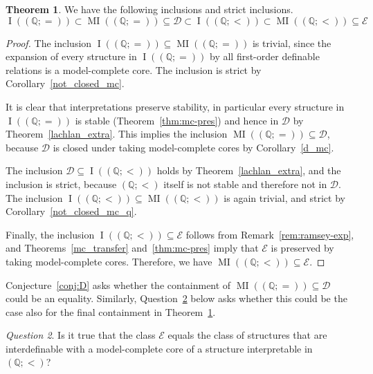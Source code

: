 \documentclass{amsart}
\theoremstyle{definition}
\newtheorem{theorem}{Theorem}[section]
\theoremstyle{remark}
\newtheorem{question}[theorem]{Question}
\numberwithin{equation}{section}
\DeclareMathOperator{\I}{\operatorname{I}}
\DeclareMathOperator{\MI}{\operatorname{MI}}
\newcommand{\atoms}{({\mathbb Q};=)}
\newcommand{\order}{(\mathbb{Q};<)}
\begin{document}
\begin{theorem}\label{chain}
We have the following inclusions and strict inclusions. 
    $$\I(\atoms)\subset \MI(\atoms)\subseteq \mathcal{D}\subset \I(\order)\subset \MI(\order) \subseteq {\mathcal E}$$
\end{theorem}
\begin{proof}
    The inclusion $\I(\atoms) \subseteq \MI(\atoms)$ is trivial, since the expansion of every structure in $\I(\atoms)$ 
    by all first-order definable relations is
    a model-complete core. 
    The inclusion is strict by Corollary~\ref{not_closed_mc}.
    
   It is clear that interpretations preserve stability, in particular every structure in $\I(\atoms)$ 
    is stable (Theorem~\ref{thm:mc-pres}) and hence in ${\mathcal D}$ by Theorem~\ref{lachlan_extra}. This implies the inclusion $\MI(\atoms) \subseteq {\mathcal D}$, because ${\mathcal D}$ is closed under taking model-complete cores by Corollary~\ref{d_mc}.

    The inclusion ${\mathcal D} \subseteq \I(\order)$ holds by Theorem~\ref{lachlan_extra}, and the inclusion is strict, because $\order$ itself is not stable and therefore not in ${\mathcal D}$. 
    The inclusion $\I(\order) \subseteq \MI(\order)$ is again trivial, and strict by Corollary~\ref{not_closed_mc_q}.
    
    Finally, the inclusion $\I(\order) \subseteq {\mathcal E}$ follows from Remark~\ref{rem:ramsey-exp}, and Theorems~\ref{mc_transfer} and~\ref{thm:mc-pres} imply that ${\mathcal E}$ is preserved by taking model-complete cores. Therefore, we have $\MI(\order) \subseteq {\mathcal E}$.
\end{proof}

	Conjecture~\ref{conj:D} asks whether the containment of $\MI(\atoms)\subseteq \mathcal{D}$ could be an equality. Similarly, Question~\ref{quest:E} below asks whether this could be the case also for the final containment in Theorem~\ref{chain}.
   
\begin{question}\label{quest:E}
    Is it true that the class ${\mathcal E}$ equals the class of structures that are interdefinable with a model-complete core of a structure  interpretable in $\order$? 
\end{question}
\end{document}
